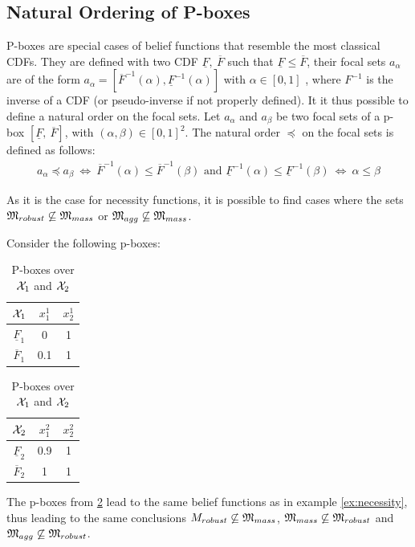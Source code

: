 \subsection{Natural Ordering of P-boxes}\label{subsec:pboxes}
P-boxes are special cases of belief functions that resemble the most classical CDFs. They are defined with two CDF $\underline{F},~\overline{F}$ such that $\underline{F}\leqslant\overline{F}$, their focal sets $a_\alpha$ are of the form $a_\alpha=[\overline{F}^{-1}(\alpha), \underline{F}^{-1}(\alpha)]$ with $\alpha\in[0,1]$ \cite{destercke_unifying_2008}, where $F^{-1}$ is the inverse of a CDF (or pseudo-inverse if not properly defined). It it thus possible to define a natural order on the focal sets. Let $a_\alpha$ and $a_\beta$ be two focal sets of a p-box $[\underline{F},~\overline{F}]$, with $(\alpha,\beta)\in[0,1]^2$. The natural order $\preceq$ on the focal sets is defined as follows:
\begin{align}
    a_\alpha\preceq a_\beta ~\Leftrightarrow~ \overline{F}^{-1}(\alpha)\leqslant\overline{F}^{-1}(\beta) \text{ and } \underline{F}^{-1}(\alpha)\leqslant\underline{F}^{-1}(\beta)~\Leftrightarrow~ \alpha\leqslant\beta\label{eq:order_pbox}
\end{align}

As it is the case for necessity functions, it is possible to find cases where the sets ${\mathfrak{M}}_{robust}\not\subseteq {\mathfrak{M}}_{mass}$ or ${\mathfrak{M}}_{agg}\not\subseteq{\mathfrak{M}}_{mass}$.
\begin{example}\label{ex:pbox}
    Consider the following p-boxes:
    \begin{table}[!ht]
        \centering
        \begin{tabular}{|c|c|c|}
            \hline
            ${\mathcal{X}}_1$ & $x^1_1$ & $x^1_2$\\
            \hline\hline
            $\underline{F}_1$ & 0 & 1\\
            \hline
            $\overline{F}_1$ & 0.1 & 1\\
            \hline
        \end{tabular}
        \quad
        \begin{tabular}{|c|c|c|}
            \hline
            ${\mathcal{X}}_2$ & $x^2_1$ & $x^2_2$\\
            \hline\hline
            $\underline{F}_2$ & 0.9 & 1\\
            \hline
            $\overline{F}_2$ & 1 & 1\\
            \hline
        \end{tabular}
        \caption{P-boxes over ${\mathcal{X}}_1$ and ${\mathcal{X}}_2$}
        \label{tab:example_pbox}
    \end{table}
    The p-boxes from \ref{tab:example_pbox} lead to the same belief functions as in example \ref{ex:necessity}, thus leading to the same conclusions \ie ${M}_{robust}\not\subseteq{\mathfrak{M}}_{mass}$, ${\mathfrak{M}}_{mass}\not\subseteq{\mathfrak{M}}_{robust}$ and ${\mathfrak{M}}_{agg}\not\subseteq{\mathfrak{M}}_{robust}$.
\end{example}

